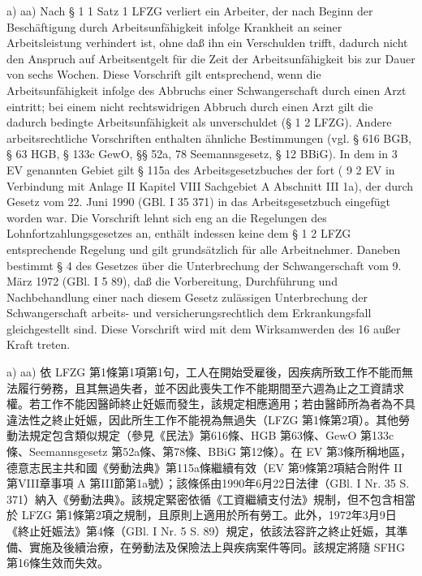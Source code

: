 \documentclass[12pt]{article}
\begin{document}
\begin{sourcepara}[title={原文E.223}]
a) aa) Nach § 1 \abbrAbs{} 1 Satz 1 LFZG verliert ein Arbeiter, der nach Beginn der Beschäftigung durch Arbeitsunfähigkeit infolge Krankheit an seiner Arbeitsleistung verhindert ist, ohne daß ihn ein Verschulden trifft, dadurch nicht den Anspruch auf Arbeitsentgelt für die Zeit der Arbeitsunfähigkeit bis zur Dauer von sechs Wochen. Diese Vorschrift gilt entsprechend, wenn die Arbeitsunfähigkeit infolge des Abbruchs einer Schwangerschaft durch einen Arzt eintritt; bei einem nicht rechtswidrigen Abbruch durch einen Arzt gilt die dadurch bedingte Arbeitsunfähigkeit als unverschuldet (§ 1 \abbrAbs{} 2 LFZG). Andere arbeitsrechtliche Vorschriften enthalten ähnliche Bestimmungen (vgl. § 616 BGB, § 63 HGB, § 133c GewO, §§ 52a, 78 Seemannsgesetz, § 12 BBiG). In dem in \abbrArt{} 3 EV genannten Gebiet gilt § 115a des Arbeitsgesetzbuches der \abbrDDR{} fort (\abbrArt{} 9 \abbrAbs{} 2 EV in Verbindung mit Anlage II Kapitel VIII Sachgebiet A Abschnitt III \abbrNr{} 1a), der durch Gesetz vom 22. Juni 1990 (GBl. I \abbrNr{} 35 \abbrS{} 371) in das Arbeitsgesetzbuch eingefügt worden war. Die Vorschrift lehnt sich eng an die Regelungen des Lohnfortzahlungsgesetzes an, enthält indessen keine dem § 1 \abbrAbs{} 2 LFZG entsprechende Regelung und gilt grundsätzlich für alle Arbeitnehmer. Daneben bestimmt § 4 des Gesetzes über die Unterbrechung der Schwangerschaft vom 9. März 1972 (GBl. I \abbrNr{} 5 \abbrS{} 89), daß die Vorbereitung, Durchführung und Nachbehandlung einer nach diesem Gesetz zulässigen Unterbrechung der Schwangerschaft arbeits- und versicherungsrechtlich dem Erkrankungsfall gleichgestellt sind. Diese Vorschrift wird mit dem Wirksamwerden des \abbrArt{} 16 \abbrSFHG{} außer Kraft treten.
\end{sourcepara}
\begin{transpara}
a) aa) 依 LFZG 第1條第1項第1句，工人在開始受雇後，因疾病所致工作不能而無法履行勞務，且其無過失者，並不因此喪失工作不能期間至六週為止之工資請求權。若工作不能因醫師終止妊娠而發生，該規定相應適用；若由醫師所為者為不具違法性之終止妊娠，因此所生工作不能視為無過失（LFZG 第1條第2項）。其他勞動法規定包含類似規定（參見《民法》第616條、HGB 第63條、GewO 第133c條、Seemannsgesetz 第52a條、第78條、BBiG 第12條）。在 EV 第3條所稱地區，德意志民主共和國《勞動法典》第115a條繼續有效（EV 第9條第2項結合附件 II 第VIII章事項 A 第III節第1a號）；該條係由1990年6月22日法律（GBl. I Nr. 35 S. 371）納入《勞動法典》。該規定緊密依循《工資繼續支付法》規制，但不包含相當於 LFZG 第1條第2項之規制，且原則上適用於所有勞工。此外，1972年3月9日《終止妊娠法》第4條（GBl. I Nr. 5 S. 89）規定，依該法容許之終止妊娠，其準備、實施及後續治療，在勞動法及保險法上與疾病案件等同。該規定將隨 SFHG 第16條生效而失效。
\end{transpara}
\end{document}
